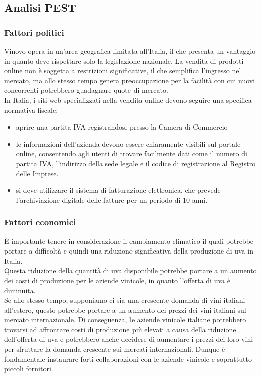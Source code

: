 \documentclass[12pt, a4paper]{article}
\begin{document}
\subsection{Analisi PEST}

\subsubsection*{Fattori politici}
Vinovo opera in un'area geografica limitata all'Italia, il che presenta un vantaggio in quanto deve rispettare solo la legislazione nazionale.
La vendita di prodotti online non è soggetta a restrizioni significative, il che semplifica l'ingresso nel mercato, ma allo stesso tempo genera preoccupazione per la facilità con cui nuovi concorrenti potrebbero guadagnare quote di mercato.\\
In Italia, i siti web specializzati nella vendita online devono seguire una specifica normativa fiscale:
\begin{itemize}[itemsep=-5pt, topsep=0pt]
    \item aprire una partita IVA registrandosi presso la Camera di Commercio
    \item le informazioni dell'azienda devono essere chiaramente visibili sul portale online, consentendo agli utenti di trovare facilmente dati come il numero di partita IVA, l'indirizzo della sede legale e il codice di registrazione al Registro delle Imprese.
    \item si deve utilizzare il sistema di fatturazione elettronica, che prevede l'archiviazione digitale delle fatture per un periodo di 10 anni.
\end{itemize}

\subsubsection*{Fattori economici}
È importante tenere in considerazione il cambiamento climatico il quali potrebbe portare a difficoltà e quindi una riduzione significativa della produzione di uva in Italia.\\
Questa riduzione della quantità di uva disponibile potrebbe portare a un aumento dei costi di produzione per le aziende vinicole, in quanto l'offerta di uva è diminuita.\\
Se allo stesso tempo, supponiamo ci sia una crescente domanda di vini italiani all'estero, questo potrebbe portare a un aumento dei prezzi dei vini italiani sul mercato internazionale.
Di conseguenza, le aziende vinicole italiane potrebbero trovarsi ad affrontare costi di produzione più elevati a causa della riduzione dell'offerta di uva e potrebbero anche decidere di aumentare i prezzi dei loro vini per sfruttare la domanda crescente sui mercati internazionali.
Dunque è fondamentale instaurare forti collaborazioni con le aziende vinicole e soprattutto piccoli fornitori.
\end{document}
